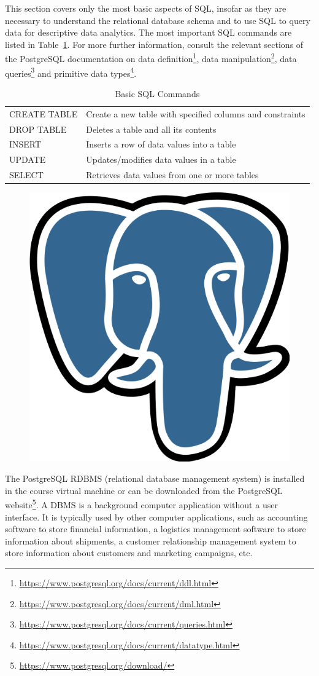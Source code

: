 This section covers only the most basic aspects of SQL, insofar as they are necessary to understand the relational database schema and to use SQL to query data for descriptive data analytics. The most important SQL commands are listed in Table~\ref{tab:sql}. For more further information, consult the relevant sections of the PostgreSQL documentation on data definition\footnote{\url{https://www.postgresql.org/docs/current/ddl.html}}, data manipulation\footnote{\url{https://www.postgresql.org/docs/current/dml.html}}, data queries\footnote{\url{https://www.postgresql.org/docs/current/queries.html}} and primitive data types\footnote{\url{https://www.postgresql.org/docs/current/datatype.html}}.

\begin{table}
\renewcommand{\arraystretch}{1.25}
\centering

\begin{tabular}{l|l} \hline
CREATE TABLE & Create a new table with specified columns and constraints \\ 
DROP TABLE & Deletes a table and all its contents \\
INSERT & Inserts a row of data values into a table \\
UPDATE & Updates/modifies data values in a table \\
SELECT & Retrieves data values from one or more tables \\ \hline
\end{tabular}
\caption{Basic SQL Commands}
\label{tab:sql}
\end{table}

\begin{figure}
\begin{center}
\includegraphics[height=.5in]{postgresql-logo.png}
\end{center}
\end{figure}

The PostgreSQL RDBMS (relational database management system) is installed in the course virtual machine or can be downloaded from the PostgreSQL website\footnote{\url{https://www.postgresql.org/download/}}. A DBMS is a background computer application without a user interface. It is typically used by other computer applications, such as accounting software to store financial information, a logistics management software to store information about shipments, a customer relationship management system to store information about customers and marketing campaigns, etc. 

